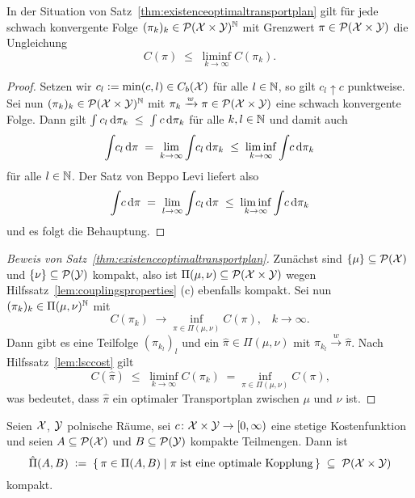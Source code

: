 \documentclass[../main/main.tex]{subfiles}
\begin{document}
	\begin{Hilfssatz}
		\label{lem:lsccost}
		In der Situation von Satz~\ref{thm:existenceoptimaltransportplan} gilt für jede schwach konvergente Folge $(\pi_k)_k \in \mathcal{P}(\mathcal{X} \times \mathcal{Y})^{\mathbb{N}}$ mit Grenzwert $\pi \in \mathcal{P}(\mathcal{X} \times \mathcal{Y})$ die Ungleichung
		\[ C(\pi) \; \leq \; \liminf_{k \to \infty} C(\pi_k) \text{.} \]
	\end{Hilfssatz}

	\begin{proof}
		Setzen wir $c_l \vcentcolon = \min(c, l) \in C_b(\mathcal{X})$ für alle $l \in \mathbb{N}$, so gilt $c_l \uparrow c$ punktweise. Sei nun $(\pi_k)_k \in \mathcal{P}(\mathcal{X} \times \mathcal{Y})^{\mathbb{N}}$ mit $\pi_k \xrightarrow{w} \pi \in \mathcal{P}(\mathcal{X} \times \mathcal{Y})$ eine schwach konvergente Folge. Dann gilt
		$\int_{} \, c_l \, \mathrm{d}\pi_k \; \leq \; \int_{} \, c \, \mathrm{d}\pi_k$ für alle $k, l \in \mathbb{N}$ und damit auch 
		\[ \int_{} \, c_l \, \mathrm{d}\pi \; = \; \lim_{k \to \infty} \int_{} \, c_l \, \mathrm{d}\pi_k \; \leq \; \liminf_{k \to \infty} \int_{} \, c \, \mathrm{d}\pi_k \]
		für alle $l \in \mathbb{N}$. Der Satz von Beppo Levi liefert also
		\[ \int_{} \, c \, \mathrm{d}\pi \; = \; \lim_{l \to \infty} \int_{} \, c_l \, \mathrm{d}\pi \; \leq \; \liminf_{k \to \infty} \int_{} \, c \, \mathrm{d}\pi_k \]
		und es folgt die Behauptung.
	\end{proof}

	\begin{proof}[Beweis von Satz~\ref{thm:existenceoptimaltransportplan}]
		Zunächst sind $\left\{\mu\right\} \subseteq \mathcal{P}(\mathcal{X})$ und $\left\{\nu\right\} \subseteq \mathcal{P}(\mathcal{Y})$ kompakt, also ist $\Pi(\mu, \nu) \subseteq \mathcal{P}(\mathcal{X} \times \mathcal{Y})$ 
		wegen Hilfssatz~\ref{lem:couplingsproperties} (c) ebenfalls kompakt.
		Sei nun $(\pi_k)_k \in \Pi(\mu, \nu)^{\mathbb{N}}$ mit
		\[ C(\pi_k) \; \to \inf_{\pi \in \Pi(\mu, \nu)} C(\pi) \text{,} \quad k \to \infty \text{.} \]
		Dann gibt es eine Teilfolge $(\pi_{k_l})_l$ und ein $\hat{\pi} \in \Pi(\mu, \nu)$ mit $\pi_{k_l} \xrightarrow{w} \hat{\pi}$. Nach Hilfssatz~\ref{lem:lsccost} gilt
		\[ C(\hat{\pi}) \; \leq \; \liminf_{k \to \infty} C(\pi_k) \; = \inf_{\pi \in \Pi(\mu, \nu)} C(\pi) \text{,} \]
		was bedeutet, dass $\hat{\pi}$ ein optimaler Transportplan zwischen $\mu$ und $\nu$ ist. 
	\end{proof}

	\begin{Satz}
		\label{thm:optimalplanscompact}
		Seien $\mathcal{X}$, $\mathcal{Y}$ polnische Räume, sei $c \colon \mathcal{X} \times \mathcal{Y} \to [0, \infty)$ eine stetige Kostenfunktion und seien $A \subseteq \mathcal{P}(\mathcal{X})$ und $B \subseteq \mathcal{P}(\mathcal{Y})$ kompakte Teilmengen.
		Dann ist 
		\[ \hat{\Pi}(A, B) \; \vcentcolon = \; \left\{\, \pi \in \Pi(A, B) \; \middle| \; \pi \; \text{ist eine optimale Kopplung} \,\right\} \; \subseteq \; \mathcal{P}(\mathcal{X} \times \mathcal{Y}) \]
		kompakt.
	\end{Satz}
\end{document}
